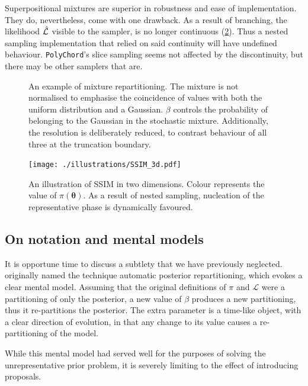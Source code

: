 \documentclass[usenatbib]{mnras}
\begin{document}
Superpositional mixtures are superior in robustness and ease of
implementation. They do, nevertheless, come with one drawback. As a
result of branching, the likelihood $\hat{\cal L}$ visible to the
sampler, is no longer continuous (\cref{fig:mixture-3d}). Thus a
nested sampling implementation that relied on said continuity will
have undefined behaviour. \texttt{PolyChord}'s slice sampling seems
not affected by the discontinuity, but there may be other samplers
that are.
\begin{figure}  
  

  

  
  \caption{An example of mixture repartitioning. The mixture is not
    normalised to emphasise the coincidence of values with both the
    uniform distribution and a Gaussian. $\beta$ controls the
    probability of belonging to the Gaussian in the stochastic
    mixture.  Additionally, the resolution is deliberately reduced, to
    contrast behaviour of all three at the truncation
    boundary. \label{fig:mixture}}
\end{figure}

\begin{figure}
  \centering
  \texttt{[image: ./illustrations/SSIM\_3d.pdf]}
  \caption{An illustration of SSIM in two dimensions. Colour represents the value of $\pi(\bm{\theta})$. As a result of nested sampling, nucleation of the representative phase is dynamically favoured.}
  \label{fig:mixture-3d}
\end{figure}

\subsection{On notation and mental models}

It is opportune time to discuss a subtlety that we have previously
neglected. \cite{chen-ferroz-hobson} originally named the technique
automatic posterior repartitioning, which evokes a clear mental
model. Assuming that the original definitions of \( \pi \) and
\(\mathcal{L}\) were a partitioning of only the posterior, a new value
of \(\beta\) produces a new partitioning, thus it re-partitions the
posterior.  The extra parameter is a time-like object, with a clear
direction of evolution, in that any change to its value causes a
re-partitioning of the model.

While this mental model had served well for the purposes of solving
the unrepresentative prior problem, it is severely limiting to the
effect of introducing proposals.
\end{document}
